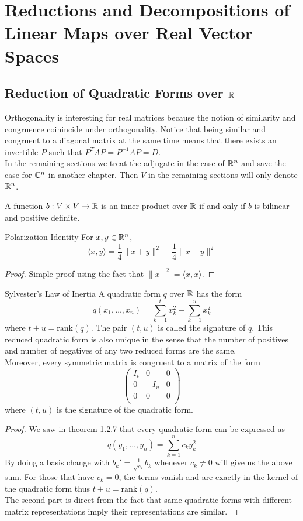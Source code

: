 \documentclass[a4paper]{article}
\begin{document}
\pagebreak
\section{Reductions and Decompositions of Linear Maps over Real Vector Spaces}
\subsection{Reduction of Quadratic Forms over $\mathbb{R}$}
Orthogonality is interesting for real matrices because the notion of similarity and congruence coinincide under orthogonality. Notice that being similar and congruent to a diagonal matrix at the same time means that there exists an invertible $P$ such that $P^TAP=P^{-1}AP=D$. \\

In the remaining sections we treat the adjugate in the case of $\mathbb{R}^n$ and save the case for $\mathbb{C}^n$ in another chapter. Then $V$ in the remaining sections will only denote $\mathbb{R}^n$. 

\begin{prp}{}{} A function $b:V\times V\to\mathbb{R}$ is an inner product over $\mathbb{R}$ if and only if $b$ is bilinear and positive definite. 
\end{prp}

\begin{lmm}{Polarization Identity}{} For $x,y\in\mathbb{R}^n$, $$\langle x,y\rangle=\frac{1}{4}\|x+y\|^2-\frac{1}{4}\|x-y\|^2$$
\begin{proof} Simple proof using the fact that $\|x\|^2=\langle x,x\rangle$. 
\end{proof}
\end{lmm}

\begin{prp}{Sylvester's Law of Inertia}{} A quadratic form $q$ over $\mathbb{R}$ has the form $$q(x_1,\dots,x_n)=\sum_{k=1}^tx_k^2-\sum_{k=1}^ux_k^2$$ where $t+u=\text{rank}(q)$. The pair $(t,u)$ is called the signature of $q$. This reduced quadratic form is also unique in the sense that the number of positives and number of negatives of any two reduced forms are the same. \\ Moreover, every symmetric matrix is congruent to a matrix of the form $$\begin{pmatrix}
I_t & 0 & 0\\
0 & -I_u & 0\\
0 & 0 & 0\\
\end{pmatrix}$$ where $(t,u)$ is the signature of the quadratic form. 
\begin{proof}
We saw in theorem 1.2.7 that every quadratic form can be expressed as $$q(y_1,\dots,y_n)=\sum_{k=1}^nc_ky_k^2$$ By doing a basis change with $b_k'=\frac{1}{\sqrt{c_k}}b_k$ whenever $c_k\neq 0$ will give us the above sum. For those that have $c_k=0$, the terms vanish and are exactly in the kernel of the quadratic form thus $t+u=\text{rank}(q)$. \\
The second part is direct from the fact that same quadratic forms with different matrix representations imply their representations are similar. 
\end{proof}
\end{prp}
\end{document}
